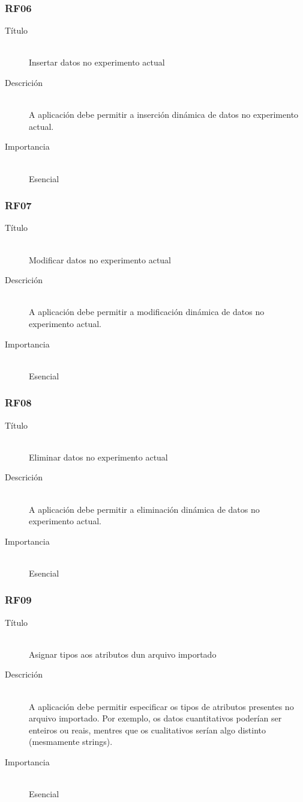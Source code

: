 \subsubsection*{RF06}
\begin{description}
\item[Título] \hfill \\
Insertar datos no experimento actual
\item[Descrición] \hfill \\
A aplicación debe permitir a inserción dinámica de datos no experimento actual.
\item[Importancia] \hfill \\
Esencial
\end{description}

\subsubsection*{RF07}
\begin{description}
\item[Título] \hfill \\
Modificar datos no experimento actual
\item[Descrición] \hfill \\
A aplicación debe permitir a modificación dinámica de datos no experimento actual.
\item[Importancia] \hfill \\
Esencial
\end{description}

\subsubsection*{RF08}
\begin{description}
\item[Título] \hfill \\
Eliminar datos no experimento actual
\item[Descrición] \hfill \\
A aplicación debe permitir a eliminación dinámica de datos no experimento actual.
\item[Importancia] \hfill \\
Esencial
\end{description}

\subsubsection*{RF09}
\begin{description}
\item[Título] \hfill \\
Asignar tipos aos atributos dun arquivo importado
\item[Descrición] \hfill \\
A aplicación debe permitir especificar os tipos de atributos presentes no arquivo importado. Por exemplo, os datos cuantitativos poderían ser enteiros ou reais, mentres que os cualitativos serían algo distinto (mesmamente strings).
\item[Importancia] \hfill \\
Esencial
\end{description}

